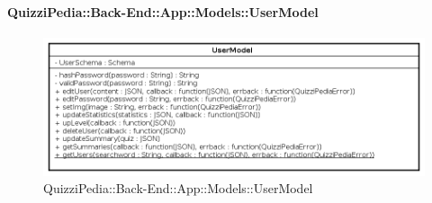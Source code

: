 \paragraph{QuizziPedia::Back-End::App::Models::UserModel}
\label{QuizziPedia::Back-End::App::Models::UserModel}
\begin{figure}[ht]
	\centering
	\includegraphics[scale=0.45]{UML/Classi/Back-End/QuizziPedia_Back-End_App_Models_userModel.png}
	\caption{QuizziPedia::Back-End::App::Models::UserModel}
\end{figure}
\FloatBarrier
